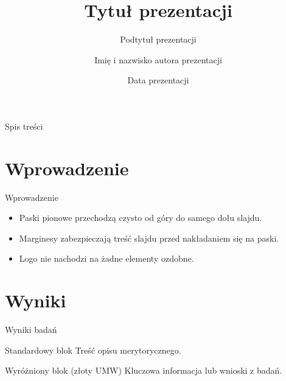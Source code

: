 \documentclass[aspectratio=169]{beamer}
\title[Tytuł prezentacji]{Tytuł prezentacji}
\subtitle{Podtytuł prezentacji}
\author[Imię i nazwisko]{Imię i nazwisko autora prezentacji}
\institute{Uniwersytet Medyczny im. Piastów Śląskich we Wrocławiu}
\date[Data]{Data prezentacji}
\begin{document}
\begin{frame}
    \titlepage
\end{frame}

\begin{frame}{Spis treści}
    \tableofcontents
\end{frame}

\section{Wprowadzenie}

\begin{frame}{Wprowadzenie}
    \begin{itemize}
        \item Paski pionowe przechodzą czysto od góry do samego dołu slajdu.
        \item Marginesy zabezpieczają treść slajdu przed nakładaniem się na paski.
        \item Logo nie nachodzi na żadne elementy ozdobne.
    \end{itemize}
\end{frame}

\section{Wyniki}

\begin{frame}{Wyniki badań}
    \begin{block}{Standardowy blok}
        Treść opisu merytorycznego.
    \end{block}

    \begin{alertblock}{Wyróżniony blok (złoty UMW)}
        Kluczowa informacja lub wnioski z badań.
    \end{alertblock}
\end{frame}
\end{document}
